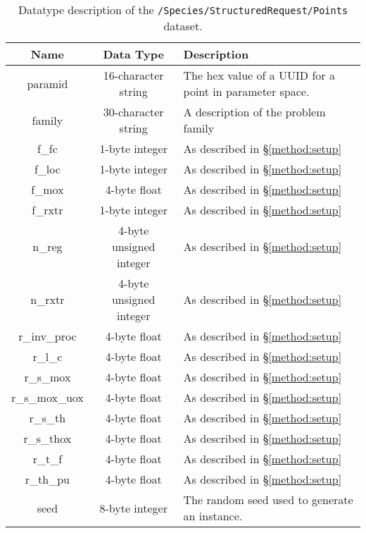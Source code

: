 \begin{table}[h!]
\centering
\label{tbl:/Species/StructuredRequest/Points}
\caption{Datatype description of the \lstinline[basicstyle=\ttfamily\color{black}]|/Species/StructuredRequest/Points| dataset.}
\begin{tabularx}{\columnwidth-10pt}{|c|c|X|} %
\hline
\textbf{Name} & \textbf{Data Type} & \textbf{Description}       \\ \hline
paramid & 16-character string & The hex value of a UUID for a point in parameter space. \\ \hline
family & 30-character string & A description of the problem family \\ \hline
f\_fc & 1-byte integer & As described in \S \ref{method:setup} \\ \hline
f\_loc & 1-byte integer & As described in \S \ref{method:setup} \\ \hline
f\_mox & 4-byte float & As described in \S \ref{method:setup} \\ \hline
f\_rxtr & 1-byte integer & As described in \S \ref{method:setup} \\ \hline
n\_reg & 4-byte unsigned integer & As described in \S \ref{method:setup} \\ \hline
n\_rxtr & 4-byte unsigned integer & As described in \S \ref{method:setup} \\ \hline
r\_inv\_proc & 4-byte float & As described in \S \ref{method:setup} \\ \hline
r\_l\_c & 4-byte float & As described in \S \ref{method:setup} \\ \hline
r\_s\_mox & 4-byte float & As described in \S \ref{method:setup} \\ \hline
r\_s\_mox\_uox & 4-byte float & As described in \S \ref{method:setup} \\ \hline
r\_s\_th & 4-byte float & As described in \S \ref{method:setup} \\ \hline
r\_s\_thox & 4-byte float & As described in \S \ref{method:setup} \\ \hline
r\_t\_f & 4-byte float & As described in \S \ref{method:setup} \\ \hline
r\_th\_pu & 4-byte float & As described in \S \ref{method:setup} \\ \hline
seed & 8-byte integer & The random seed used to generate an instance. \\ \hline
\end{tabularx}
\end{table}



